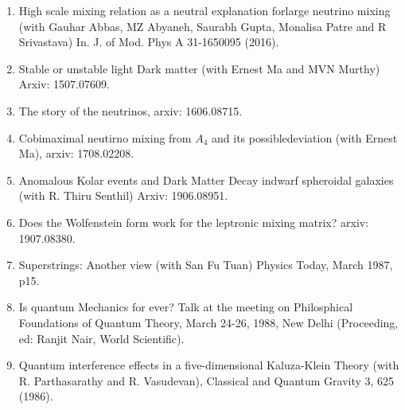 \begin{enumerate}
\item High scale mixing relation as a neutral explanation for\break large neutrino mixing (with Gauhar Abbas, MZ Abyaneh, Saurabh Gupta, Monalisa Patre and R Srivastava) In. J. of Mod. Phys A 31-1650095 (2016).

\item Stable or unstable light Dark matter (with Ernest Ma and MVN Murthy) Arxiv: 1507.07609.

\item The story of the neutrinos, arxiv: 1606.08715.

\item Cobimaximal neutirno mixing from $A_4$ and its possible\break deviation (with Ernest Ma), arxiv: 1708.02208.

\item Anomalous Kolar events and Dark Matter Decay in\break dwarf spheroidal galaxies (with R. Thiru Senthil) Arxiv: 1906.08951.

\item Does the Wolfenstein form work for the leptronic mixing matrix? arxiv: 1907.08380.

\item Superstrings: Another view (with San Fu Tuan) Physics Today, March 1987, p15.

\item Is quantum Mechanics for ever? Talk at the meeting on Philosphical Foundations of Quantum Theory, March 24-26, 1988, New Delhi (Proceeding, ed: Ranjit Nair, World Scientific).

\item Quantum interference effects in a five-dimensional Kaluza-Klein Theory (with R. Parthasarathy and R. Vasudevan), Classical and Quantum Gravity 3, 625 (1986).
\end{enumerate}

\newpage
